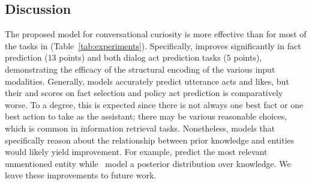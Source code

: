 \subsection{Discussion}

The proposed \charm{} model for conversational curiosity is more effective than \mtbert{} for most of the tasks in \rover{} (Table~\ref{tab:experiments}).
Specifically, \charm{} improves significantly in fact prediction ($13$ \mrr{} points) and both dialog act prediction tasks ($5$ \fone{} points), demonstrating the efficacy of the structural encoding of the various input modalities.
Generally, models accurately predict utterance acts and likes, but their \mrr{} and \fone{} scores on fact selection and policy act prediction is comparatively worse.
To a degree, this is expected since there is not always one best fact or one best action to take as the assistant; there may be various reasonable choices, which is common in information retrieval tasks.
Nonetheless, models that specifically reason about the relationship between prior knowledge and entities would likely yield improvement.
For example, \citet{Liu2018KnowledgeDF} predict the most relevant unmentioned entity while~\citet{Lian2019LearningTS} model a posterior distribution over knowledge.
We leave these improvements to future work.
